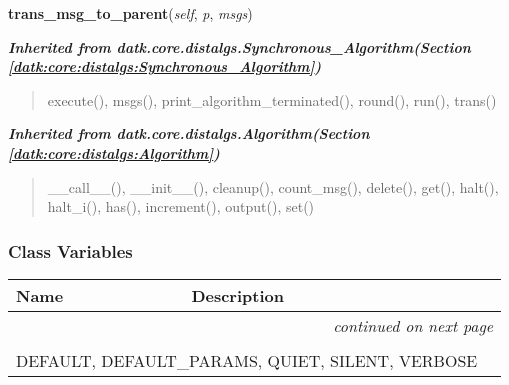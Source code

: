     \vspace{0.5ex}

\hspace{.8\funcindent}\begin{boxedminipage}{\funcwidth}

    \raggedright \textbf{trans\_msg\_to\_parent}(\textit{self}, \textit{p}, \textit{msgs})

\setlength{\parskip}{2ex}
\setlength{\parskip}{1ex}
    \end{boxedminipage}


\large{\textbf{\textit{Inherited from datk.core.distalgs.Synchronous\_Algorithm\textit{(Section \ref{datk:core:distalgs:Synchronous_Algorithm})}}}}

\begin{quote}
execute(), msgs(), print\_algorithm\_terminated(), round(), run(), trans()
\end{quote}

\large{\textbf{\textit{Inherited from datk.core.distalgs.Algorithm\textit{(Section \ref{datk:core:distalgs:Algorithm})}}}}

\begin{quote}
\_\_call\_\_(), \_\_init\_\_(), cleanup(), count\_msg(), delete(), get(), halt(), halt\_i(), has(), increment(), output(), set()
\end{quote}


  \subsubsection{Class Variables}

    \vspace{-1cm}
\hspace{\varindent}\begin{longtable}{|p{\varnamewidth}|p{\vardescrwidth}|l}
\cline{1-2}
\cline{1-2} \centering \textbf{Name} & \centering \textbf{Description}& \\
\cline{1-2}
\endhead\cline{1-2}\multicolumn{3}{r}{\small\textit{continued on next page}}\\\endfoot\cline{1-2}
\endlastfoot\multicolumn{2}{|l|}{\textit{Inherited from datk.core.distalgs.Algorithm \textit{(Section \ref{datk:core:distalgs:Algorithm})}}}\\
\multicolumn{2}{|p{\varwidth}|}{\raggedright DEFAULT, DEFAULT\_PARAMS, QUIET, SILENT, VERBOSE}\\
\cline{1-2}
\end{longtable}

